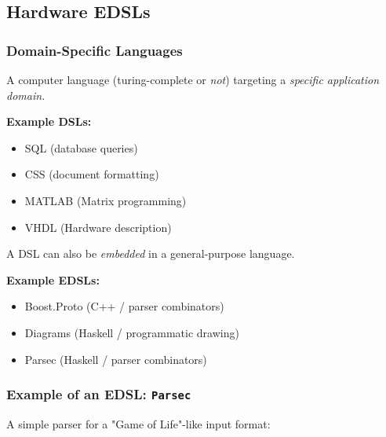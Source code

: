     \subsection{Hardware EDSLs}
    \label{subsec:hardware-edsls}
        \begin{frame}
            \frametitle{Domain-Specific Languages}

            \par{A computer language (turing-complete or \emph{not}) targeting a \emph{specific application domain.}}
            \par{\textbf{Example DSLs:}}
            \begin{itemize}
                \item SQL (database queries)
                \item CSS (document formatting)
                \item MATLAB (Matrix programming)
                \item VHDL (Hardware description)
            \end{itemize}

            \pause

            \vspace{0.3cm}
            \par{A DSL can also be \emph{embedded} in a general-purpose language.}
            \par{\textbf{Example EDSLs:}}
            \begin{itemize}
                \item Boost.Proto (C++ / parser combinators)
                \item Diagrams (Haskell / programmatic drawing)
                \item Parsec (Haskell / parser combinators)
            \end{itemize}
        \end{frame}

        \begin{frame}
            \frametitle{Example of an EDSL: \texttt{Parsec}}

            A simple parser for a "Game of Life"-like input format:
        \end{frame}

